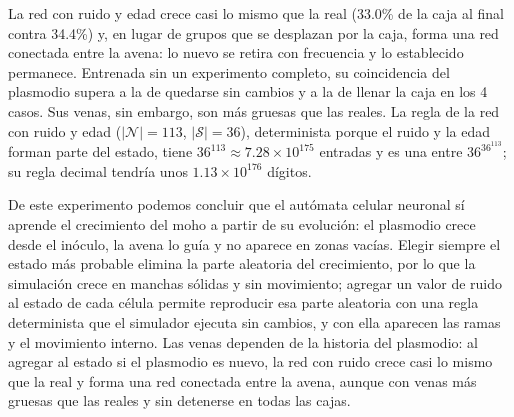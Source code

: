 La red con ruido y edad crece casi lo mismo que la real (33.0\% de la caja al final contra 34.4\%) y, en lugar de grupos que se desplazan por la caja, forma una red conectada entre la avena: lo nuevo se retira con frecuencia y lo establecido permanece. Entrenada sin un experimento completo, su coincidencia del plasmodio supera a la de quedarse sin cambios y a la de llenar la caja en los 4 casos. Sus venas, sin embargo, son más gruesas que las reales. La regla de la red con ruido y edad ($|\mathcal{N}| = 113$, $|\mathcal{S}| = 36$), determinista porque el ruido y la edad forman parte del estado, tiene $36^{113} \approx 7.28 \times 10^{175}$ entradas y es una entre $36^{36^{113}}$; su regla decimal tendría unos $1.13 \times 10^{176}$ dígitos.

De este experimento podemos concluir que el autómata celular neuronal sí aprende el crecimiento del moho a partir de su evolución: el plasmodio crece desde el inóculo, la avena lo guía y no aparece en zonas vacías. Elegir siempre el estado más probable elimina la parte aleatoria del crecimiento, por lo que la simulación crece en manchas sólidas y sin movimiento; agregar un valor de ruido al estado de cada célula permite reproducir esa parte aleatoria con una regla determinista que el simulador ejecuta sin cambios, y con ella aparecen las ramas y el movimiento interno. Las venas dependen de la historia del plasmodio: al agregar al estado si el plasmodio es nuevo, la red con ruido crece casi lo mismo que la real y forma una red conectada entre la avena, aunque con venas más gruesas que las reales y sin detenerse en todas las cajas.
